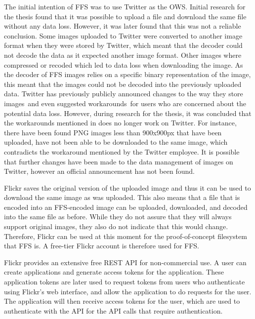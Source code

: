 The initial intention of FFS was to use Twitter as the OWS. Initial research for the thesis found that it was possible to upload a file and download the same file without any data loss. However, it was later found that this was not a reliable conclusion. Some images uploaded to Twitter were converted to another image format when they were stored by Twitter, which meant that the decoder could not decode the data as it expected another image format. Other images where compressed or recoded which led to data loss when downloading the image. As the decoder of FFS images relies on a specific binary representation of the image, this meant that the images could not be decoded into the previously uploaded data. Twitter has previously publicly announced changes to the way they store images\,\cite{nolanobrienUpcomingChangesPNG2018} and even suggested workarounds\,\cite{nolanobrienFeedbackUpcomingChanges2019} for users who are concerned about the potential data loss. However, during research for the thesis, it was concluded that the workarounds mentioned in \cite{nolanobrienFeedbackUpcomingChanges2019} does no longer work on Twitter. For instance, there have been found PNG images less than 900x900px that have been uploaded, have not been able to be downloaded to the same image, which contradicts the workaround mentioned by the Twitter employee. It is possible that further changes have been made to the data management of images on Twitter, however an official announcement has not been found.

Flickr saves the original version of the uploaded image and thus it can be used to download the same image as was uploaded. This also means that a file that is encoded into an FFS-encoded image can be uploaded, downloaded, and decoded into the same file as before. While they do not assure that they will always support original images, they also do not indicate that this would change. Therefore, Flickr can be used at this moment for the proof-of-concept filesystem that FFS is. A free-tier Flickr account is therefore used for FFS. 

Flickr provides an extensive free REST API for non-commercial use. A user can create applications and generate access tokens for the application. These application tokens are later used to request tokens from users who authenticate using Flickr's web interface, and allow the application to do requests for the user. The application will then receive access tokens for the user, which are used to authenticate with the API for the API calls that require authentication.

